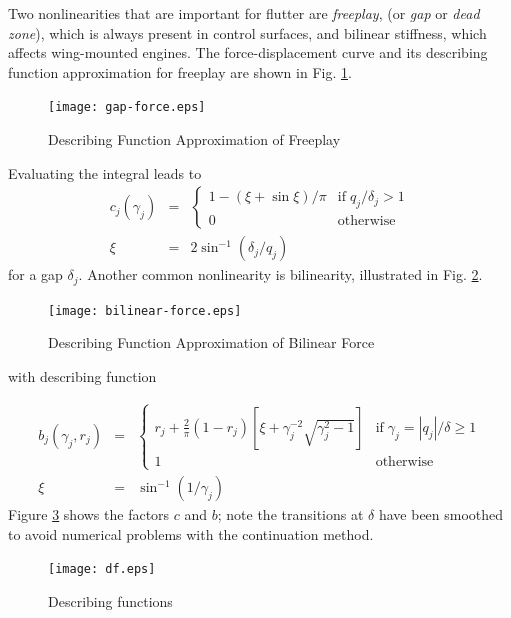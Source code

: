 \documentclass[11pt,openany,twoside]{book}
\numberwithin{equation}{section}		%
\newcommand{\Newterm}[1]{{\em #1}}	%
\newcommand{\Figref}[1]{Fig. \ref{#1}}  %
\begin{document}
Two nonlinearities that are important for flutter are \Newterm{freeplay},
(or \Newterm{gap} or \Newterm{dead zone}),
which is always present in control surfaces, and bilinear stiffness,
which affects wing-mounted engines.
The force-displacement curve and its describing function approximation
for freeplay are shown in \Figref{fig:gap-force}.
\begin{figure}[ht] 	%
		\texttt{[image: gap-force.eps]}
	\centering
	\caption{Describing Function Approximation of Freeplay}\label{fig:gap-force}
\end{figure}
Evaluating the integral leads to
\begin{eqnarray}
\label{eqn:gap}
c_j(\gamma_j)  & = &
	\begin{cases}
		1 - (\xi + \sin{\xi})/\pi &
			\text{if} \; q_j/\delta_j > 1 \nonumber \\
		0 & \text{otherwise}
	\end{cases} \\
	\xi & = & 2\sin^{-1}(\delta_j/q_j)
\end{eqnarray}
for a gap $\delta_j$. Another common nonlinearity is bilinearity,
illustrated in \Figref{fig:bilinear-force}.
\begin{figure}[!ht]	%
		\texttt{[image: bilinear-force.eps]}
	\centering
	\caption{Describing Function Approximation of Bilinear Force}\label{fig:bilinear-force}
\end{figure}
with describing function

\begin{eqnarray}
\label{eqn:bilinear}
b_j(\gamma_j,r_j) & = &
	\begin{cases}
		r_j + \frac{2}{\pi} (1 - r_j) \left[ \xi + \gamma_j^{-2} \sqrt{\gamma_j^2 - 1} \right] & \text{if} \; \gamma_j = |q_j|/\delta \ge 1 \\
		1 & \text{otherwise}
	\end{cases} \\
	\xi & = & \sin^{-1}(1/\gamma_j)
\end{eqnarray}
Figure \ref{fig:df} shows the factors $c$ and $b$; note the transitions
at $\delta$ have been smoothed to avoid numerical problems with the
continuation method.
\begin{figure}[!ht]	%
	\texttt{[image: df.eps]}
\centering
\caption{Describing functions}\label{fig:df}
\end{figure}
\end{document}

